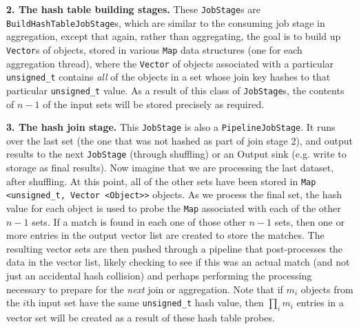 \vspace{5pt}
{\bf 2. The hash table building stages.} These \texttt{JobStage}s are
\texttt{BuildHashTableJobStage}s, which are similar to the consuming job stage in aggregation, 
except that again, rather than aggregating, the goal is to build up \texttt{Vector}s of objects, stored in various \texttt{Map} data structures (one for each
aggregation thread), where the \texttt{Vector} of objects associated with a particular 
\texttt{unsigned\_t} contains \emph{all} of the objects in a set whose join key hashes to that particular \texttt{unsigned\_t} value.
As a result of this class of \texttt{JobStage}s, the contents of $n - 1$ of the input sets will be stored precisely as required.

\vspace{5pt}
{\bf 3. The hash join stage.} 
This \texttt{JobStage} is also a \texttt{PipelineJobStage}. It runs over the last set (the one that was not 
hashed as part of join stage 2), and output results to the next
\texttt{JobStage} (through shuffling) or an Output sink (e.g. write to storage
as final results). Now imagine that we are processing the last dataset, after shuffling.  At this point,
all of the other sets have been
stored in \texttt{Map <unsigned\_t, Vector <Object}\texttt{>}\texttt{>} objects.  As we process the final set,
the hash value for each object is used to probe the \texttt{Map}
associated with each of the other $n-1$ sets.  If a match is found in each one of those other $n-1$ sets, then
one or more entries in the output vector list are created to store the matches.  The resulting vector sets are then pushed through a pipeline that post-processes
the data in the vector list, likely checking to see if this was an actual match (and not just an accidental hash collision) and perhaps performing the processing
necessary to prepare for the \emph{next} join or aggregation.
Note that if $m_i$ objects from the $i$th input set have the same \texttt{unsigned\_t} hash value, then $\prod_i m_i$ entries in a vector set will be created
as a result of these hash table probes. 

